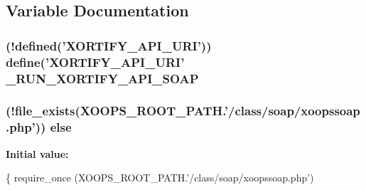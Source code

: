 \subsection{Variable Documentation}
\hypertarget{auth__soap_8php_a07583d496751dd9a708941cbd134b611}{
\subsubsection[{\-\_\-\-R\-U\-N\-\_\-\-X\-O\-R\-T\-I\-F\-Y\-\_\-\-A\-P\-I\-\_\-\-S\-O\-A\-P}]{ (!defined('X\-O\-R\-T\-I\-F\-Y\-\_\-\-A\-P\-I\-\_\-\-U\-R\-I')) define('X\-O\-R\-T\-I\-F\-Y\-\_\-\-A\-P\-I\-\_\-\-U\-R\-I' \-\_\-\-R\-U\-N\-\_\-\-X\-O\-R\-T\-I\-F\-Y\-\_\-\-A\-P\-I\-\_\-\-S\-O\-A\-P}}\label{auth__soap_8php_a07583d496751dd9a708941cbd134b611}
\hypertarget{auth__soap_8php_aa1dfe8b03eb0a67bfa60d8a6a976ff12}{
\subsubsection[{else}]{ (!file\-\_\-exists(X\-O\-O\-P\-S\-\_\-\-R\-O\-O\-T\-\_\-\-P\-A\-T\-H.'/class/soap/xoopssoap.\-php')) else}}\label{auth__soap_8php_aa1dfe8b03eb0a67bfa60d8a6a976ff12}
{\bfseries Initial value\-:}
\begin{DoxyCode}
\{
    require\_once (XOOPS\_ROOT\_PATH.\textcolor{stringliteral}{'/class/soap/xoopssoap.php'})
\end{DoxyCode}
